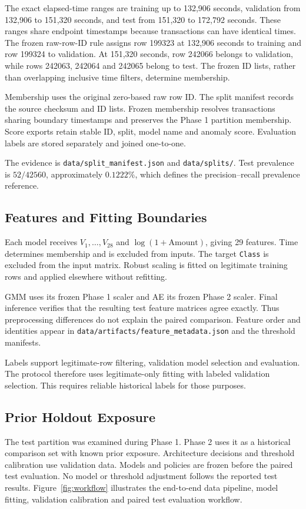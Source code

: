 \documentclass[conference]{IEEEtran}
\newcommand{\artifact}[1]{{\footnotesize\nolinkurl{#1}}}
\begin{document}
The exact elapsed-time ranges are training up to 132,906 seconds, validation from 132,906 to 151,320 seconds, and test from 151,320 to 172,792 seconds. These ranges share endpoint timestamps because transactions can have identical times. The frozen raw-row-ID rule assigns row 199323 at 132,906 seconds to training and row 199324 to validation. At 151,320 seconds, row 242066 belongs to validation, while rows 242063, 242064 and 242065 belong to test. The frozen ID lists, rather than overlapping inclusive time filters, determine membership.

Membership uses the original zero-based raw row ID. The split manifest records the source checksum and ID lists. Frozen membership resolves transactions sharing boundary timestamps and preserves the Phase 1 partition membership. Score exports retain stable ID, split, model name and anomaly score. Evaluation labels are stored separately and joined one-to-one.

The evidence is \artifact{data/split_manifest.json} and \artifact{data/splits/}. Test prevalence is $52/42560$, approximately $0.1222\%$, which defines the precision--recall prevalence reference.

\subsection{Features and Fitting Boundaries}
Each model receives $V_1,\ldots,V_{28}$ and $\log(1+\mathrm{Amount})$, giving 29 features. Time determines membership and is excluded from inputs. The target \texttt{Class} is excluded from the input matrix. Robust scaling is fitted on legitimate training rows and applied elsewhere without refitting.

GMM uses its frozen Phase 1 scaler and AE its frozen Phase 2 scaler. Final inference verifies that the resulting test feature matrices agree exactly. Thus preprocessing differences do not explain the paired comparison. Feature order and identities appear in \artifact{data/artifacts/feature_metadata.json} and the threshold manifests.

Labels support legitimate-row filtering, validation model selection and evaluation. The protocol therefore uses legitimate-only fitting with labeled validation selection. This requires reliable historical labels for those purposes.

\subsection{Prior Holdout Exposure}
The test partition was examined during Phase 1. Phase 2 uses it as a historical comparison set with known prior exposure. Architecture decisions and threshold calibration use validation data. Models and policies are frozen before the paired test evaluation. No model or threshold adjustment follows the reported test results. Figure~\ref{fig:workflow} illustrates the end-to-end data pipeline, model fitting, validation calibration and paired test evaluation workflow.
\end{document}

